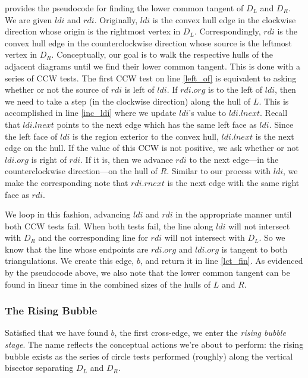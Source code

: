 \documentclass[12pt,twoside]{reedthesis}
\begin{document}
       provides the pseudocode for finding the lower common tangent of $D_{L}$ and $D_{R}$. We are given $ldi$ and $rdi$. Originally, $ldi$ is the convex hull edge in the clockwise direction whose origin is the rightmost vertex in $D_{L}$. Correspondingly, $rdi$ is the convex hull edge in the counterclockwise direction whose source is the leftmost vertex in $D_{R}$. Conceptually, our goal is to walk  the respective hulls of the adjacent diagrams until we find their lower common tangent. This is done with a series of \textsc{CCW} tests. The first \textsc{CCW} test on line \ref{left_of} is equivalent to asking whether or not the source of $rdi$ is left of $ldi$. If $rdi.org$ is to the left of $ldi$, then we need to take a step (in the clockwise direction) along the hull of $L$. This is accomplished in line \ref{inc_ldi} where we update $ldi$'s value to $ldi.lnext$. Recall that $ldi.lnext$ points to the next edge which has the same left face as $ldi$. Since the left face of $ldi$ is the region exterior to the convex hull, $ldi.lnext$ is the next edge on the hull. If the value of this \textsc{CCW} is not positive, we ask whether or not $ldi.org$ is right of $rdi$. If it is, then we advance $rdi$ to the next edge---in the counterclockwise direction---on the hull of $R$. Similar to our process with $ldi$, we make the corresponding note that $rdi.rnext$ is the next edge with the same right face as $rdi$.\par

      We loop in this fashion, advancing $ldi$ and $rdi$ in the appropriate manner until both \textsc{CCW} tests fail. When both tests fail, the line along $ldi$ will not intersect with $D_{R}$ and the corresponding line for $rdi$ will not intersect with $D_{L}$. So we know that the line whose endpoints are $rdi.org$ and $ldi.org$ is tangent to both triangulations. We create this edge, $b$, and return it in line \ref{lct_fin}. As evidenced by the pseudocode above, we also note that the lower common tangent can be found in linear time in the combined sizes of the hulls of $L$ and $R$. \par

    \subsubsection{The Rising Bubble} %
    \label{ssub:the_rising_bubble}

      Satisfied that we have found $b$, the first cross-edge, we enter the \emph{rising bubble stage}. The name reflects the conceptual actions we're about to perform: the rising bubble exists as the series of circle tests performed (roughly) along the vertical bisector separating $D_{L}$ and $D_{R}$.\par
      
\end{document}
